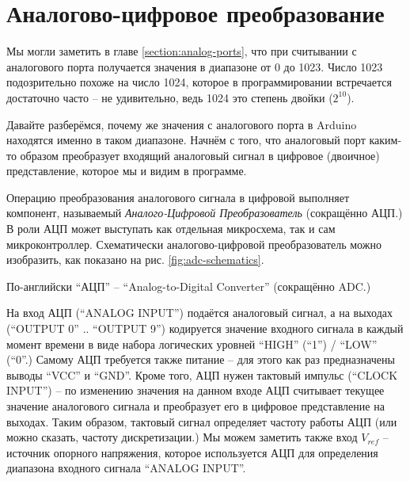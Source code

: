 \documentclass[../sparc.tex]{subfiles}
\begin{document}
\newpage
\section{Аналогово-цифровое преобразование}



Мы могли заметить в главе \ref{section:analog-ports}, что при считывании с
аналогового порта получается значения в диапазоне от 0 до 1023.  Число 1023
подозрительно похоже на число 1024, которое в программировании встречается
достаточно часто -- не удивительно, ведь 1024 это степень двойки ($2^{10}$).

Давайте разберёмся, почему же значения с аналогового порта в Arduino находятся
именно в таком диапазоне.  Начнём с того, что аналоговый порт каким-то образом
преобразует входящий аналоговый сигнал в цифровое (двоичное) представление,
которое мы и видим в программе.

Операцию преобразования аналогового сигнала в цифровой выполняет компонент,
называемый \emph{Аналого-Цифровой Преобразователь} (сокращённо \gls{АЦП}.)  В
роли АЦП может выступать как отдельная микросхема, так и сам микроконтроллер.
Схематически аналогово-цифровой преобразователь можно изобразить, как показано
на рис. \ref{fig:adc-schematics}.

По-английски ``АЦП'' -- ``Analog-to-Digital Converter'' (сокращённо \gls{ADC}.)



На вход АЦП (``ANALOG INPUT'') подаётся аналоговый сигнал, а на выходах
(``OUTPUT 0'' .. ``OUTPUT 9'') кодируется значение входного сигнала в каждый
момент времени в виде набора логических уровней ``HIGH'' (``1'') / ``LOW''
(``0''.)  Самому АЦП требуется также питание -- для этого как раз предназначены
выводы ``VCC'' и ``GND''.  Кроме того, АЦП нужен тактовый импульс (``CLOCK
INPUT'') -- по изменению значения на данном входе АЦП считывает текущее значение
аналогового сигнала и преобразует его в цифровое представление на выходах.
Таким образом, тактовый сигнал определяет частоту работы АЦП (или можно сказать,
частоту дискретизации.)  Мы можем заметить также вход $V_{ref}$ -- источник
опорного напряжения, которое используется АЦП для определения диапазона входного
сигнала ``ANALOG INPUT''.
\end{document}
